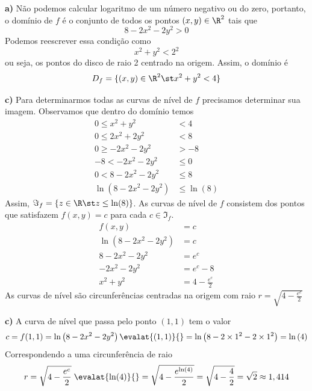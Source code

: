 \documentclass[a4paper,12pt,fleqn]{article}
\begin{document}
\begin{answer}
\textbf{a)} \quad
  Não podemos calcular logaritmo de um número negativo ou do zero,
  portanto, o domínio de $f$ é o conjunto
  de todos os pontos \((x, y)\in\R^2\) tais que
  \[
    8-2x^2-2y^2 > 0
  \]
  Podemos reescrever essa condição como
  \[
    x^2 + y^2 < 2^2
  \]
  ou seja, os pontos do disco de raio 2 centrado na origem.
  Assim, o domínio é
  \[
    D_f = \{(x, y) \in \R^2 \st x^2 + y^2 < 4\}
  \]

\bigskip
\textbf{c)} \quad
  Para determinarmos todas as curvas de nível de $f$ precisamos determinar sua
  imagem. Observamos que dentro do domínio temos
  \begin{align*}
    0 \leq x^2+y^2              & < 4         \\
    0 \leq 2x^2+2y^2            & < 8         \\
    0 \geq -2x^2-2y^2           & > -8         \\
    -8 < -2x^2-2y^2             & \leq 0      \\
    0 < 8-2x^2-2y^2             & \leq 8      \\[2mm]
    \ln\left(8-2x^2-2y^2\right) & \leq \ln(8)
  \end{align*}
  Assim, \(\Im_f = \left\{z\in\R \st z \leq \ln(8)\right\}\).
  As curvas de nível de $f$ consistem dos pontos que satisfazem
  \(
    f(x, y) = c
  \)
  para cada \(c\in\Im_f\).
  \begin{align*}
    f(x, y)                     & = c                 \\[2mm]
    \ln\left(8-2x^2-2y^2\right) & = c                 \\[2mm]
    8-2x^2-2y^2                 & = e^c               \\[2mm]
    - 2x^2 - 2y^2               & = e^c - 8           \\[2mm]
    x^2 + y^2                   & = 4 - \frac{e^c}{2}
  \end{align*}
  As curvas de nível são circunferências centradas na origem com raio
  \(
    r = \sqrt{4 - \frac{e^c}{2}}
  \)

\bigskip
\textbf{c)} \quad
A curva de nível que passa pelo ponto $(1, 1)$ tem o valor
\[
  c
  = f(1, 1)
  = \ln\left(8-2x^2-2y^2\right) \evalat{(1, 1)}{}
  = \ln\left(8-2\times 1^2-2\times 1^2\right)
  = \ln\left(4\right)
\]
Correspondendo a uma circunferência de raio
\[
  r
  = \sqrt{4 - \frac{e^c}{2}} \; \evalat{\ln(4)}{}
  = \sqrt{4 - \frac{e^{\ln(4)}}{2}}
  = \sqrt{4 - \frac{4}{2}}
  = \sqrt{2}
  \approx 1,414
\]

\end{answer}

\end{document}
